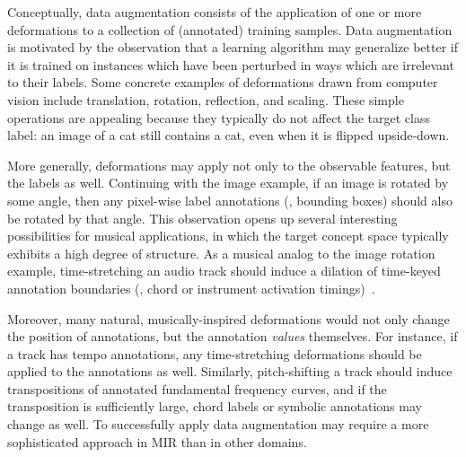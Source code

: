\documentclass{article}
\begin{document}
Conceptually, data augmentation consists of the application of one or more deformations to
a collection of (annotated) training samples.
Data augmentation is motivated by the observation that a learning algorithm may
generalize better if it is trained on instances which have been perturbed in ways 
which are irrelevant to their labels.
Some concrete examples of deformations drawn from computer vision include translation,
rotation, reflection, and scaling.
These simple operations are appealing because they typically do not affect the target 
class label: an image of a cat still contains a cat, even when it is flipped upside-down.

More generally, deformations may apply not only to the observable features, but the labels as well.
Continuing with the image example, if an image is rotated by some angle, 
then any pixel-wise label annotations (\eg, bounding boxes) should also be rotated by
that angle.
This observation opens up several interesting possibilities for musical applications, in
which the target concept space typically exhibits a high degree of structure.
As a musical analog to the image rotation example, time-stretching an audio track 
should induce a dilation of time-keyed annotation boundaries (\eg, chord or instrument
activation timings)~\cite{mauch2013audio}.

Moreover, many natural, musically-inspired deformations
would not only change the position of annotations, but the annotation
\emph{values} themselves.
For instance, if a track has tempo annotations, any time-stretching deformations should
be applied to the annotations as well.
Similarly, pitch-shifting a track should induce transpositions of annotated fundamental
frequency curves, and if the transposition is sufficiently large, chord labels or symbolic 
annotations may change as well.
To successfully apply data augmentation may require a more sophisticated approach in MIR
than in other domains.

\end{document}
